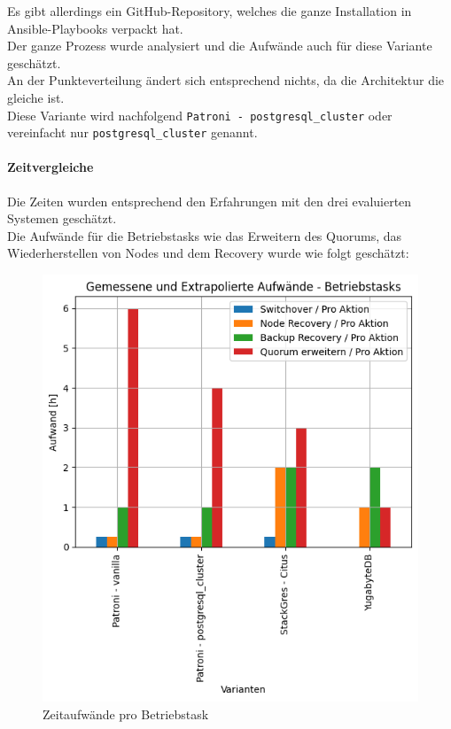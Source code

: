 \begin{flushleft}
    Es gibt allerdings ein \Gls{GitHub}-Repository, welches die ganze Installation in \Gls{Ansible}-Playbooks verpackt hat.\\
    Der ganze Prozess wurde analysiert und die Aufwände auch für diese Variante geschätzt.\\
    An der Punkteverteilung ändert sich entsprechend nichts, da die Architektur die gleiche ist.\\
    Diese Variante wird nachfolgend \texttt{Patroni - postgresql\_cluster} oder vereinfacht nur \texttt{postgresql\_cluster} genannt.
    \paragraph{Zeitvergleiche}
    Die Zeiten wurden entsprechend den Erfahrungen mit den drei evaluierten Systemen geschätzt.\\

    
    Die Aufwände für die Betriebstasks wie das Erweitern des Quorums, das Wiederherstellen von Nodes und dem Recovery wurde wie folgt geschätzt:
    \begin{figure}[H]
        \centering
        \includegraphics[width=0.75\linewidth]{source/pandas_data_chart_plotter/time_investment_action}
        \caption{Zeitaufwände pro Betriebstask}
        \label{fig:time_investment_action}
    \end{figure}
\end{flushleft}
